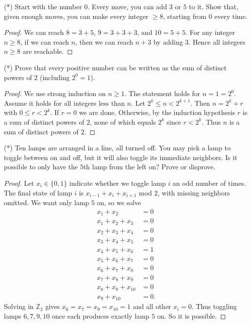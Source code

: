 \documentclass[12pt]{article}
\begin{document}
\begin{problem}
(*) Start with the number $0$. Every move, you can add $3$ or $5$ to it. Show that, given enough moves, you can make every integer $\geq 8$, starting from $0$ every time.
\begin{proof}
We can reach $8=3+5$, $9=3+3+3$, and $10=5+5$. For any integer $n\ge 8$, if we can reach $n$, then we can reach $n+3$ by adding $3$. Hence all integers $n\ge 8$ are reachable.
\end{proof}
\end{problem}

\begin{problem}
\label{powers-of-two-sum}
(*) Prove that every positive number can be written as the sum of distinct powers of $2$ (including $2^0 = 1$).
\begin{proof}
We use strong induction on $n\ge 1$. The statement holds for $n=1=2^0$. Assume it holds for all integers less than $n$. Let $2^k\le n<2^{k+1}$. Then $n=2^k+r$ with $0\le r<2^k$. If $r=0$ we are done. Otherwise, by the induction hypothesis $r$ is a sum of distinct powers of $2$, none of which equals $2^k$ since $r<2^k$. Thus $n$ is a sum of distinct powers of $2$.
\end{proof}
\end{problem}

\begin{problem}
(*) Ten lamps are arranged in a line, all turned off. You may pick a lamp to toggle between on and off, but it will also toggle its immediate neighbors. Is it possible to only have the $5$th lamp from the left on? Prove or disprove.
\begin{proof}
Let $x_i\in\{0,1\}$ indicate whether we toggle lamp $i$ an odd number of times. The final state of lamp $i$ is $x_{i-1}+x_i+x_{i+1}$ mod $2$, with missing neighbors omitted. We want only lamp $5$ on, so we solve
\[
\begin{aligned}
x_1+x_2&=0\\
x_1+x_2+x_3&=0\\
x_2+x_3+x_4&=0\\
x_3+x_4+x_5&=0\\
x_4+x_5+x_6&=1\\
x_5+x_6+x_7&=0\\
x_6+x_7+x_8&=0\\
x_7+x_8+x_9&=0\\
x_8+x_9+x_{10}&=0\\
x_9+x_{10}&=0.
\end{aligned}
\]
Solving in $\mathbb{Z}_2$ gives $x_6=x_7=x_9=x_{10}=1$ and all other $x_i=0$. Thus toggling lamps $6,7,9,10$ once each produces exactly lamp $5$ on. So it is possible.
\end{proof}
\end{problem}
\end{document}
